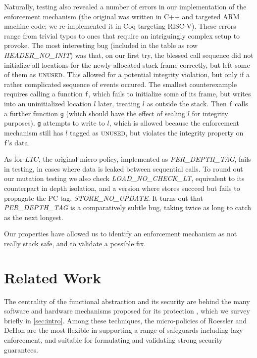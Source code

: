 \documentclass[10pt,conference]{ieeetran}%
\theoremstyle{definition}
\begin{document}
Naturally, testing also revealed a number of errors in our
implementation of the enforcement mechanism (the original was written in C++
and targeted ARM machine code;
we re-implemented it in Coq targeting RISC-V).  These errors range
from trivial typos to ones that require an intriguingly complex setup
to provoke.  The most interesting bug (included in the table as row
{\em HEADER\_NO\_INIT}) was that, on our first try, the blessed call
sequence %
did not initialize all locations for the
newly allocated stack frame correctly, but left some of them as
$\textsc{unused}$. This allowed for a potential integrity violation, but
only if a rather complicated sequence of events occured.
The smallest counterexample requires calling a function {\tt f},
which fails to initialize some of its frame,
but writes into an uninitialized location $l$ later, treating \(l\) as outside
the stack. Then {\tt f} calls a further function {\tt g} (which should have
the effect of sealing $l$ for integrity purposes). {\tt g} attempts to write to $l$,
which is allowed because the enforcement mechanism still has
$l$ tagged as $\textsc{unused}$, but violates the integrity property on {\tt f}'s data.

As for \(LTC\), the original micro-policy, implemented as {\em PER\_DEPTH\_TAG},
fails in testing, in cases where data is leaked between sequential calls.
To round out our mutation testing we also check {\em LOAD\_NO\_CHECK\_LT},
equivalent to its counterpart in depth isolation,
and a version where stores succeed but fails to propagate the PC tag, {\em STORE\_NO\_UPDATE}.
It turns out that {\em PER\_DEPTH\_TAG} is a comparatively subtle bug,
taking twice as long to catch as the next longest.

Our properties have allowed us to identify an enforcement mechanism as
not really stack safe, and to validate a possible fix.

\section{Related Work}
\label{sec:relwork}

The centrality of the functional abstraction and its security are behind the
many software and hardware mechanisms proposed for its protection
\cite{Cowan+98, NagarakatteZMZ09, NagarakatteZMZ10, DeviettiBMZ08,
Kuznetsov+14, Dang+15, Shanbhogue+19, Woodruff+14, Chisnall+15,
SkorstengaardLocal, SkorstengaardSTKJFP, Georges22:TempsDesCerises,
DBLP:conf/sp/RoesslerD18, Gollapudi+23}, which we survey briefly in
\cref{sec:intro}. Among these techniques, the micro-policies of Roessler and
DeHon \cite{DBLP:conf/sp/RoesslerD18} are the most flexible in supporting a
range of safeguards including lazy enforcement, and suitable for formulating
and validating strong security guarantees.
\end{document}
